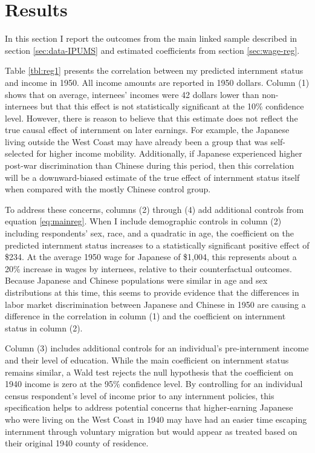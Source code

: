 \section{Results}\label{sec:results}
In this section I report the outcomes from the main linked sample
described in section \ref{sec:data-IPUMS} 
and estimated coefficients from section \ref{sec:wage-reg}.



Table \ref{tbl:reg1} presents the correlation between my predicted internment status and income in 1950.
All income amounts are reported in 1950 dollars.
Column (1) shows that on average, internees' incomes were 42 dollars lower than non-internees 
but that this effect is not statistically significant at the 10\% confidence level.
However, there is reason to believe that this estimate does not reflect the true causal effect of internment on later earnings.
For example, the Japanese living outside the West Coast may have already been a group that was self-selected for higher income mobility.
Additionally, if Japanese experienced higher post-war discrimination than Chinese during this period,
then this correlation will be a downward-biased estimate of the true effect of internment status itself when compared with the 
mostly Chinese control group.

To address these concerns, columns (2) through (4) 
add additional controls from equation \ref{eq:mainreg}.
When I include demographic controls in column (2) 
including respondents' sex, race, and a quadratic in age,
the coefficient on the predicted internment status increases 
to a statistically significant positive effect of \$234.
At the average 1950 wage for Japanese of \$1,004, 
this represents about a 20\% increase in wages by internees,
relative to their counterfactual outcomes.
Because Japanese and Chinese populations were similar in age and sex
distributions at this time,
this seems to provide evidence that the differences in labor market 
discrimination between Japanese and Chinese in 1950
are causing a difference in the correlation in column (1) 
and the coefficient on internment status in column (2).

Column (3) includes additional controls for an individual's 
pre-internment income and their level of education.
While the main coefficient on internment status remains similar,
a Wald test rejects the null hypothesis
that the coefficient on 1940 income is zero
at the 95\% confidence level.
By controlling for an individual census respondent's level of income
prior to any internment policies,
this specification helps to address potential concerns
that higher-earning Japanese who were living on the West Coast in 1940
may have had an easier time escaping internment through voluntary migration
but would appear as treated based on their original 1940 county of residence.

